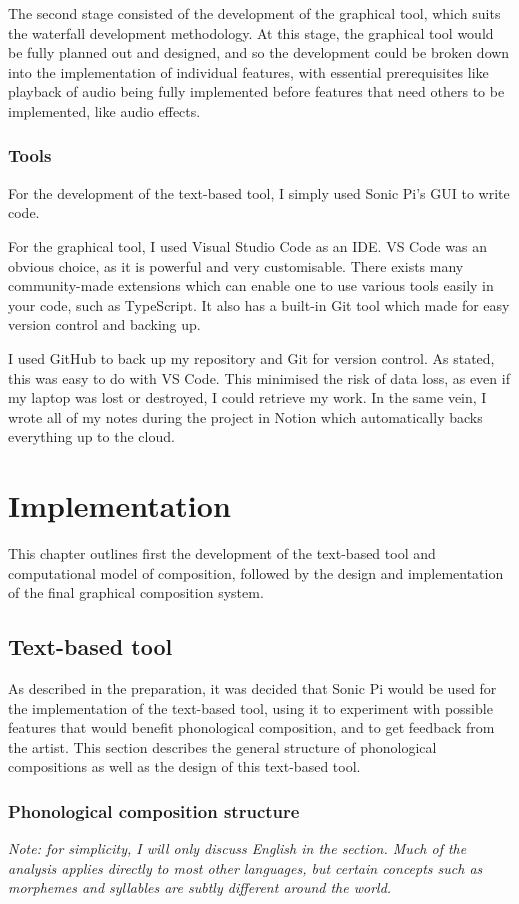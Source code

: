 \documentclass[12pt,a4paper,oneside,openright]{report}
\begin{document}
The second stage consisted of the development of the graphical tool, which suits the waterfall development methodology. At this stage, the graphical tool would be fully planned out and designed, and so the development could be broken down into the implementation of individual features, with essential prerequisites like playback of audio being fully implemented before features that need others to be implemented, like audio effects.

\subsection{Tools}
For the development of the text-based tool, I simply used Sonic Pi's GUI to write code.

For the graphical tool, I used Visual Studio Code as an IDE. VS Code was an obvious choice, as it is powerful and very customisable. There exists many community-made extensions which can enable one to use various tools easily in your code, such as TypeScript. It also has a built-in Git tool which made for easy version control and backing up.

I used GitHub to back up my repository and Git for version control. As stated, this was easy to do with VS Code. This minimised the risk of data loss, as even if my laptop was lost or destroyed, I could retrieve my work. In the same vein, I wrote all of my notes during the project in Notion which automatically backs everything up to the cloud.

\chapter{Implementation}
This chapter outlines first the development of the text-based tool and computational model of composition, followed by the design and implementation of the final graphical composition system.

\section{Text-based tool}
As described in the preparation, it was decided that Sonic Pi would be used for the implementation of the text-based tool, using it to experiment with possible features that would benefit phonological composition, and to get feedback from the artist. This section describes the general structure of phonological compositions as well as the design of this text-based tool.

\subsection{Phonological composition structure}\label{sec:phonology}
\textit{Note: for simplicity, I will only discuss English in the section. Much of the analysis applies directly to most other languages, but certain concepts such as morphemes and syllables are subtly different around the world.}
\end{document}
